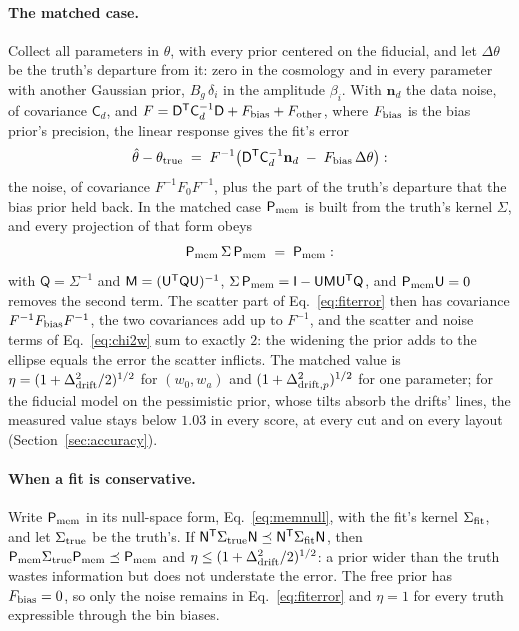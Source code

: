 \paragraph{The matched case.}
Collect all parameters in $\theta$, with every prior centered on the
fiducial, and let $\Delta\theta$ be the truth's departure from it:
zero in the cosmology and in every parameter with another Gaussian
prior, $B_g\,\delta_i$ in the amplitude $\beta_i$.  With
$\mathbf{n}_d$ the data noise, of covariance $\mathsf{C}_d$, and
$F = \mathsf{D}^{\mathsf{T}}\mathsf{C}_d^{-1}\mathsf{D} + F_{\rm bias}
+ F_{\rm other}$, where $F_{\rm bias}$ is the bias prior's precision,
the linear response gives the fit's error
\begin{equation}
  \hat{\theta} - \theta_{\rm true}
  \;=\;
  F^{-1}\bigl(\mathsf{D}^{\mathsf{T}}\mathsf{C}_d^{-1} \mathbf{n}_d
  \;-\; F_{\rm bias}\,\Delta\theta\bigr) :
  \label{eq:fiterror}
\end{equation}
the noise, of covariance $F^{-1}F_0F^{-1}$, plus the part of the
truth's departure that the bias prior held back.  In the matched case
$\mathsf{P}_{\rm mem}$ is built from the truth's kernel $\Sigma$, and every
projection of that form obeys
\begin{equation}
  \mathsf{P}_{\rm mem}\,\Sigma\,\mathsf{P}_{\rm mem} \;=\; \mathsf{P}_{\rm mem} :
  \label{eq:matched}
\end{equation}
with $\mathsf{Q} = \Sigma^{-1}$ and
$\mathsf{M} = (\mathsf{U}^{\mathsf{T}}\mathsf{Q}\mathsf{U})^{-1}$,
$\Sigma\,\mathsf{P}_{\rm mem} = \mathsf{I} - \mathsf{U}\mathsf{M}\mathsf{U}^{\mathsf{T}}\mathsf{Q}$,
and $\mathsf{P}_{\rm mem}\mathsf{U} = 0$ removes the second term.  The
scatter part of Eq.~\eqref{eq:fiterror} then has covariance
$F^{-1}F_{\rm bias}F^{-1}$, the two covariances add up to $F^{-1}$, and
the scatter and noise terms of Eq.~\eqref{eq:chi2w} sum to exactly $2$:
the widening the prior adds to the ellipse equals the error the
scatter inflicts.  The matched value is
$\eta = (1 + \Delta_{\rm drift}^2/2)^{1/2}$ for $(w_0, w_a)$ and
$(1 + \Delta_{{\rm drift},p}^2)^{1/2}$ for one parameter; for the
fiducial model on the pessimistic prior, whose tilts absorb the
drifts' lines,
the measured value stays below $1.03$ in every score, at every cut and
on every layout (Section~\ref{sec:accuracy}).

\paragraph{When a fit is conservative.}
Write $\mathsf{P}_{\rm mem}$ in its null-space form, Eq.~\eqref{eq:memnull},
with the fit's kernel $\Sigma_{\rm fit}$, and let $\Sigma_{\rm true}$
be the truth's.  If
$\mathsf{N}^{\mathsf{T}}\Sigma_{\rm true}\mathsf{N} \preceq
\mathsf{N}^{\mathsf{T}}\Sigma_{\rm fit}\mathsf{N}$, then
$\mathsf{P}_{\rm mem}\Sigma_{\rm true}\mathsf{P}_{\rm mem} \preceq \mathsf{P}_{\rm mem}$
and $\eta \le (1 + \Delta_{\rm drift}^2/2)^{1/2}$: a prior wider than the
truth wastes information but does not understate the error.  The free
prior has $F_{\rm bias} = 0$, so only the noise remains in
Eq.~\eqref{eq:fiterror} and $\eta = 1$ for every truth expressible
through the bin biases.

